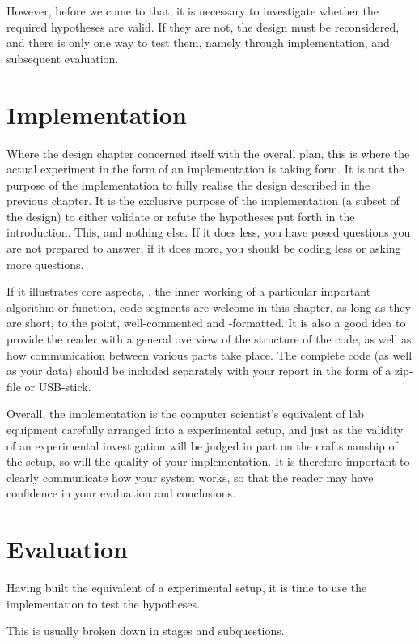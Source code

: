\documentclass[ twoside,openright,titlepage,numbers=noenddot,headinclude,%
                footinclude=true,cleardoublepage=empty,abstractoff, %
                BCOR=5mm,paper=a4,fontsize=11pt,%
                ngerman,american,%
                ]{scrreprt}
\begin{document}
However, before we come to that, it is necessary to investigate
whether the required hypotheses are valid. If they are not, the design
must be reconsidered, and there is only one way to test them, namely
through implementation, and subsequent evaluation.


\chapter{Implementation}
\label{cha:implementation}

Where the design chapter concerned itself with the overall plan, this
is where the actual experiment in the form of an implementation is
taking form.  It is not the purpose of the implementation to fully
realise the design described in the previous chapter. It is the
exclusive purpose of the implementation (a subset of the design) to
either validate or refute the hypotheses put forth in the
introduction. This, and nothing else. If it does less, you have posed
questions you are not prepared to answer; if it does more, you should
be coding less or asking more questions.

If it illustrates core aspects, \eg, the inner working of a particular
important algorithm or function, code segments are welcome in this
chapter, as long as they are short, to the point, well-commented and
-formatted.  It is also a good idea to provide the reader with a
general overview of the structure of the code, as well as how
communication between various parts take place.  The complete code (as
well as your data) should be included separately with your report in
the form of a zip-file or USB-stick.

Overall, the implementation is the computer scientist's equivalent of
lab equipment carefully arranged into a experimental setup, and just
as the validity of an experimental investigation will be judged in
part on the craftsmanship of the setup, so will the quality of your
implementation. It is therefore important to clearly communicate how
your system works, so that the reader may have confidence in your
evaluation and conclusions.


\chapter{Evaluation}
\label{cha:evaluation}

Having built the equivalent of a experimental setup, it is time to use
the implementation to test the hypotheses.

This is usually broken down in stages and subquestions.
\end{document}
